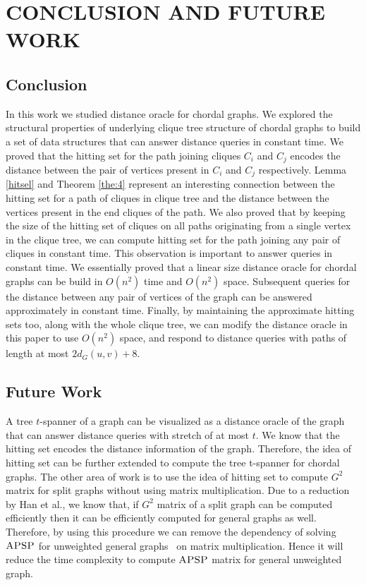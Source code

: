 \documentclass[MS,synopsis]{iitmdiss}
\begin{document}
\section{CONCLUSION AND FUTURE WORK}
 \subsection{Conclusion}
 In this work we studied distance oracle for chordal graphs. We explored the structural properties of underlying clique tree
 structure of chordal graphs to build a set of data structures that can answer distance queries in constant time.
 We proved that the hitting set for the path joining cliques $C_i$ and $C_j$ encodes the distance between the pair of vertices present in 
 $C_i$ and $C_j$ respectively. Lemma \ref{hitsel} and Theorem \ref{the:4} represent an interesting connection between the hitting set for a path of cliques
 in clique tree and the distance between the vertices present in the end cliques of the path. We also proved that by keeping the size of 
 the hitting set of cliques on all paths originating from a single vertex in the clique tree, we can compute hitting set for the path joining 
 any pair of cliques in constant time. This observation is important to answer queries in constant time.
 We essentially proved that a linear size distance oracle for chordal graphs can be build in $O(n^2)$ time and $O(n^2)$ space. 
 Subsequent queries for the distance between any pair of vertices of the graph can be answered approximately in constant time. 
 Finally, by maintaining the approximate hitting sets too, 
 along with the whole clique tree, we can modify the distance oracle in this paper to use $O(n^2)$ space, 
 and  respond to distance queries with paths of length at most $2d_G(u,v)+8$.
 
 \subsection{Future Work}
 A tree $t$-spanner of a graph can be visualized as a distance oracle of the graph that can answer distance queries with stretch of at most $t$.
 We know that the hitting set encodes the distance information of the graph.
 Therefore, the idea of hitting set can be further extended to compute the tree t-spanner for chordal graphs. 
 The other area of work is to use the idea of hitting set to compute $G^2$ matrix for split graphs without using matrix multiplication.
 Due to a reduction by Han et al.\cite{han}, we know that, if $G^2$ matrix of a split graph can be computed efficiently then it can be efficiently computed for general graphs as well.
 Therefore, by using this procedure we can remove the dependency of solving $\textsc{APSP}$ for unweighted general graphs~\cite{seidel} on matrix multiplication. 
 Hence it will reduce the time complexity to compute $\textsc{APSP}$ matrix for general unweighted graph.
 
\end{document}
